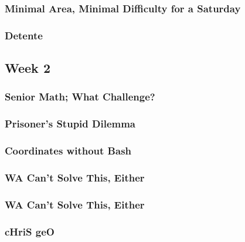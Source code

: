 \documentclass[titlepage=true]{scrartcl}
\begin{document}
	\subsubsection{Minimal Area, Minimal Difficulty for a Saturday}
	\label{15-1-6}
	
	\newpage

	\subsubsection{Detente}
	\label{15-1-7}
	
	\newpage
    
    \subsection{Week 2}
    
    \subsubsection{Senior Math; What Challenge?}
	\label{15-2-1}
	
	\newpage

	\subsubsection{Prisoner's Stupid Dilemma}
	\label{15-2-2}
	
	\newpage

	\subsubsection{Coordinates without Bash}
	\label{15-2-3}
	
	\newpage

	\subsubsection{WA Can't Solve This, Either}
	\label{15-2-4}
	
	\newpage

	\subsubsection{WA Can't Solve This, Either}
	\label{15-2-5}
	
	\newpage

	\subsubsection{cHriS geO}
	\label{15-2-6}
	
	\newpage
\end{document}
